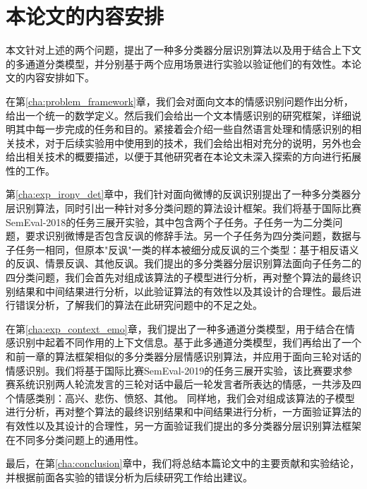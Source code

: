 \section{本论文的内容安排}

本文针对上述的两个问题，提出了一种多分类器分层识別算法以及用于结合上下文的多通道分类模型，并分别基于两个应用场景进行实验以验证他们的有效性。本论文的内容安排如下。

在第\ref{cha:problem_framework}章，我们会对面向文本的情感识别问题作出分析，给出一个统一的数学定义。然后我们会给出一个文本情感识别的研究框架，详细说明其中每一步完成的任务和目的。紧接着会介绍一些自然语言处理和情感识别的相关技术，对于后续实验用中使用到的技术，我们会给出相对充分的说明，另外也会给出相关技术的概要描述，以便于其他研究者在本论文未深入探索的方向进行拓展性的工作。

第\ref{cha:exp_irony_det}章中，我们针对面向微博的反讽识别提出了一种多分类器分层识别算法，同时引出一种针对多分类问题的算法设计框架。我们将基于国际比赛SemEval-2018的任务三\cite{van2018semeval}展开实验，其中包含两个子任务。子任务一为二分类问题，要求识别微博是否包含反讽的修辞手法。另一个子任务为四分类问题，数据与子任务一相同，但原本"反讽"一类的样本被细分成反讽的三个类型：基于相反语义的反讽、情景反讽、其他反讽。我们提出的多分类器分层识别算法面向子任务二的四分类问题，我们会首先对组成该算法的子模型进行分析，再对整个算法的最终识别结果和中间结果进行分析，以此验证算法的有效性以及其设计的合理性。最后进行错误分析，了解我们的算法在此研究问题中的不足之处。

在第\ref{cha:exp_context_emo}章，我们提出了一种多通道分类模型，用于结合在情感识别中起着不同作用的上下文信息。基于此多通道分类模型，我们再给出了一个和前一章的算法框架相似的多分类器分层情感识别算法，并应用于面向三轮对话的情感识别。我们将基于国际比赛SemEval-2019的任务三\cite{SemEval2019Task3}展开实验，该比赛要求参赛系统识别两人轮流发言的三轮对话中最后一轮发言者所表达的情感，一共涉及四个情感类别：高兴、悲伤、愤怒、其他。
同样地，我们会对组成该算法的子模型进行分析，再对整个算法的最终识别结果和中间结果进行分析，一方面验证算法的有效性以及其设计的合理性，另一方面验证我们提出的多分类器分层识别算法框架在不同多分类问题上的通用性。

最后，在第\ref{cha:conclusion}章中，我们将总结本篇论文中的主要贡献和实验结论，并根据前面各实验的错误分析为后续研究工作给出建议。












